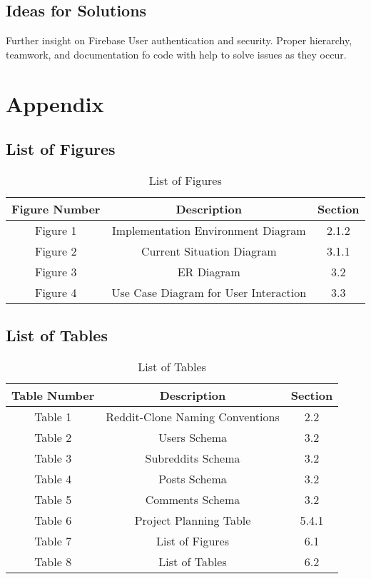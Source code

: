 \documentclass[12pt,fleqn]{article}
\begin{document}
\subsection {Ideas for Solutions}
Further insight on Firebase User authentication and security. 
Proper hierarchy, teamwork, and documentation fo code with help to solve issues as they occur.

\pagebreak
\section {Appendix}
\subsection {List of Figures}
\begin{table}[H]
\begin{tabular}{|c|c|c|}
\hline
Figure Number & Description & Section \\
\hline
Figure 1 & Implementation Environment Diagram & 2.1.2 \\
\hline
Figure 2 & Current Situation Diagram & 3.1.1 \\
\hline
Figure 3 & ER Diagram & 3.2 \\
\hline
Figure 4 & Use Case Diagram for User Interaction & 3.3 \\
\hline
\end{tabular}
\caption{List of Figures} \label{tab:figures}
\end{table}

\subsection {List of Tables}
\begin{table}[H]
\begin{tabular}{|c|c|c|}
\hline
Table Number & Description & Section \\
\hline
Table 1 & Reddit-Clone Naming Conventions & 2.2 \\
\hline
Table 2 & Users Schema & 3.2 \\
\hline
Table 3 & Subreddits Schema & 3.2 \\
\hline
Table 4 & Posts Schema & 3.2 \\
\hline
Table 5 & Comments Schema & 3.2 \\
\hline
Table 6 & Project Planning Table & 5.4.1\\
\hline
Table 7 & List of Figures & 6.1 \\
\hline
Table 8 & List of Tables & 6.2 \\
\hline
\end{tabular}
\caption{List of Tables} \label{tab:tables}
\end{table}
\end{document}

